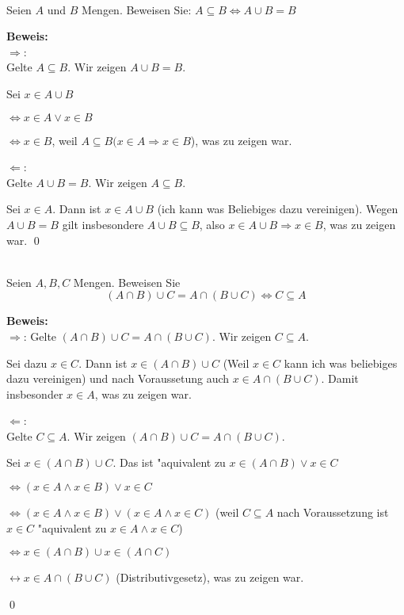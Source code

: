 \\
Seien $A$ und $B$ Mengen. Beweisen Sie:
$A\subseteq B\Leftrightarrow A\cup B=B$

\begin{loesung}
\textbf{Beweis:}\\
\glqq $\Rightarrow$\grqq :\\
Gelte $A\subseteq B$. Wir zeigen $A\cup B=B$.

Sei $x\in A\cup B$

$\Leftrightarrow x\in A\vee x\in B$

$\Leftrightarrow x\in B$, weil $A\subseteq B (x\in A\Rightarrow x\in B$), was zu zeigen war.

\glqq$\Leftarrow$\grqq:\\
Gelte $A\cup B=B$. Wir zeigen $A\subseteq B$.

Sei $x\in A$. Dann ist $x\in A\cup B$ (ich kann was Beliebiges dazu vereinigen). Wegen $A\cup B=B$ gilt insbesondere $A\cup B\subseteq B$, also $x\in A\cup B\Rightarrow x\in B$, was zu zeigen war.
\qed

\end{loesung}


\\
Seien $A,B,C$ Mengen. Beweisen Sie \[(A\cap B)\cup C=A\cap (B\cup C)\Leftrightarrow C\subseteq A\]

\begin{loesung}
  \textbf{Beweis:}\\
\glqq $\Rightarrow$\grqq: Gelte $(A\cap B)\cup C=A\cap(B\cup C)$. Wir zeigen $C\subseteq A$.

Sei dazu $x\in C$. Dann ist $x\in (A\cap B)\cup C$ (Weil $x\in C$ kann ich was beliebiges dazu vereinigen) und nach Voraussetung auch 
$x\in A\cap (B\cup C)$. Damit insbesonder $x\in A$, was zu zeigen war.

\glqq $\Leftarrow$\grqq:\\
Gelte $C\subseteq A$. Wir zeigen $(A\cap B)\cup C=A\cap(B\cup C)$.

Sei $x\in (A\cap B)\cup C$. Das ist "aquivalent zu $x\in (A\cap B)\vee x\in C$

$\Leftrightarrow (x\in A\wedge x\in B)\vee x\in C$

$\Leftrightarrow (x\in A\wedge x\in B)\vee (x\in A\wedge x\in C)$ (weil $C\subseteq A$ nach Voraussetzung ist $x\in C$ "aquivalent zu $x\in A\wedge x\in C$)

$\Leftrightarrow x\in (A\cap B)\cup x\in (A\cap C)$

$\leftrightarrow x\in A\cap(B\cup C)$ (Distributivgesetz), was zu zeigen war.

\qed

\end{loesung}
